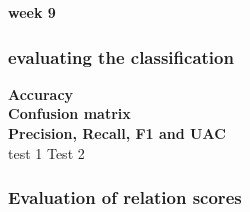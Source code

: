 \textbf{week 9} \\



\subsubsection{evaluating the classification}
\textbf{Accuracy} \\

\textbf{Confusion matrix} \\

\textbf{Precision, Recall, F1 and UAC} \\

\large test 1 \normalsize Test 2



\subsubsection{Evaluation of relation scores}


